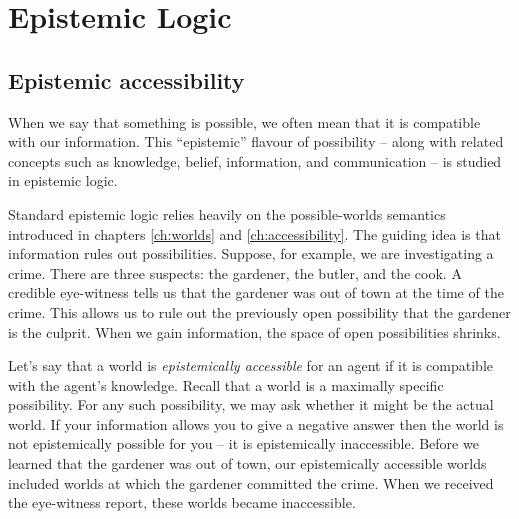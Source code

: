 \chapter{Epistemic Logic}\label{ch:epistemic}


\section{Epistemic accessibility}

When we say that something is possible, we often mean that it is compatible with
our information. This ``epistemic'' flavour of possibility -- along with related
concepts such as knowledge, belief, information, and communication -- is studied
in epistemic logic.

Standard epistemic logic relies heavily on the possible-worlds semantics
introduced in chapters \ref{ch:worlds} and \ref{ch:accessibility}. The guiding
idea is that information rules out possibilities. Suppose, for example, we are
investigating a crime. There are three suspects: the gardener, the butler, and
the cook. A credible eye-witness tells us that the gardener was out of town at
the time of the crime. This allows us to rule out the previously open
possibility that the gardener is the culprit. When we gain information, the
space of open possibilities shrinks.


Let's say that a world is \emph{epistemically accessible} for an agent if it is
compatible with the agent's knowledge. Recall that a world is a maximally
specific possibility. For any such possibility, we may ask whether it might be
the actual world. If your information allows you to give a negative answer then
the world is not epistemically possible for you -- it is epistemically
inaccessible. Before we learned that the gardener was out of town, our
epistemically accessible worlds included worlds at which the gardener committed
the crime. When we received the eye-witness report, these worlds became
inaccessible.

